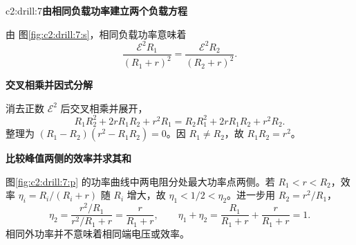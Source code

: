 \begin{drillsolution}{c2:drill:7}\textbf{由相同负载功率建立两个负载方程}\par\nobreak
由 图\ref{fig:c2:drill:7:s}，相同负载功率意味着
\[
 \frac{\mathcal E^2R_1}{(R_1+r)^2}
 =\frac{\mathcal E^2R_2}{(R_2+r)^2}.
\]


\par\medskip{}\noindent\textbf{交叉相乘并因式分解}\par\nobreak
消去正数 $\mathcal E^2$ 后交叉相乘并展开，
\[
 R_1R_2^2+2rR_1R_2+r^2R_1
 =R_2R_1^2+2rR_1R_2+r^2R_2.
\]
整理为 $(R_1-R_2)(r^2-R_1R_2)=0$。因 $R_1\ne R_2$，故 $R_1R_2=r^2$。



\par\medskip{}\noindent\textbf{比较峰值两侧的效率并求其和}\par\nobreak
图\ref{fig:c2:drill:7:p} 的功率曲线中两电阻分处最大功率点两侧。若 $R_1<r<R_2$，效率 $\eta_i=R_i/(R_i+r)$ 随 $R_i$ 增大，故 $\eta_1<1/2<\eta_2$。进一步用 $R_2=r^2/R_1$，
\[
 \eta_2=\frac{r^2/R_1}{r^2/R_1+r}
 =\frac{r}{R_1+r},\qquad
 \eta_1+\eta_2=\frac{R_1}{R_1+r}+\frac r{R_1+r}=1.
\]相同外功率并不意味着相同端电压或效率。\end{drillsolution}
